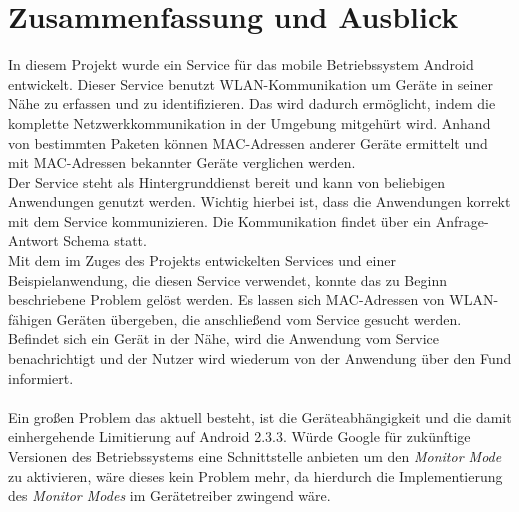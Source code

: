 \documentclass[]{report}
\begin{document}
\chapter{Zusammenfassung und Ausblick}
In diesem Projekt wurde ein Service für das mobile Betriebssystem Android entwickelt. Dieser Service benutzt WLAN-Kommunikation um Geräte in seiner Nähe zu erfassen und zu identifizieren. Das wird dadurch ermöglicht, indem die komplette Netzwerkkommunikation in der Umgebung mitgehürt wird. Anhand von bestimmten Paketen können MAC-Adressen anderer Geräte ermittelt und mit MAC-Adressen bekannter Geräte verglichen werden. \\ 
Der Service steht als Hintergrunddienst bereit und kann von beliebigen Anwendungen genutzt werden. Wichtig hierbei ist, dass die Anwendungen korrekt mit dem Service kommunizieren. Die Kommunikation findet über ein Anfrage-Antwort Schema statt. \\
Mit dem im Zuges des Projekts entwickelten Services und einer Beispielanwendung, die diesen Service verwendet, konnte das zu Beginn beschriebene Problem gelöst werden. Es lassen sich MAC-Adressen von WLAN-fähigen Geräten übergeben, die anschließend vom Service gesucht werden. Befindet sich ein Gerät in der Nähe, wird die Anwendung vom Service benachrichtigt und der Nutzer wird wiederum von der Anwendung über den Fund informiert. \\\\
Ein großen Problem das aktuell besteht, ist die Geräteabhängigkeit und die damit einhergehende Limitierung auf Android 2.3.3. Würde Google für zukünftige Versionen des Betriebssystems eine Schnittstelle anbieten um den \textit{Monitor Mode} zu aktivieren, wäre dieses kein Problem mehr, da hierdurch die Implementierung des \textit{Monitor Modes} im Gerätetreiber zwingend wäre.
\end{document}
